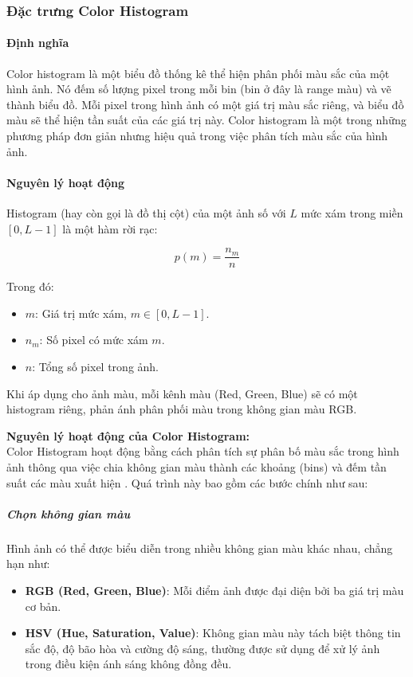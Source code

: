 \documentclass[a4paper,12pt]{article}
\begin{document}
\subsubsection{Đặc trưng Color Histogram}

\paragraph{Định nghĩa}
\hspace{5mm}Color histogram là một biểu đồ thống kê thể hiện phân phối màu sắc của một hình ảnh. Nó đếm số lượng pixel trong mỗi bin (bin ở đây là range màu) và vẽ thành biểu đồ. Mỗi pixel trong hình ảnh có một giá trị màu sắc riêng, và biểu đồ màu sẽ thể hiện tần suất của các giá trị này. Color histogram là một trong những phương pháp đơn giản nhưng hiệu quả trong việc phân tích màu sắc của hình ảnh.

\paragraph{Nguyên lý hoạt động}
\hspace{5mm}Histogram (hay còn gọi là đồ thị cột) của một ảnh số với \(L\) mức xám trong miền \([0, L-1]\) \cite{imageprocessing2019digital} là một hàm rời rạc:

\[
p(m) = \frac{n_m}{n}
\]

Trong đó:
\begin{itemize}
    \item \(m\): Giá trị mức xám, \(m \in [0, L-1]\).
    \item \(n_m\): Số pixel có mức xám \(m\).
    \item \(n\): Tổng số pixel trong ảnh.
\end{itemize}

Khi áp dụng cho ảnh màu, mỗi kênh màu (Red, Green, Blue) sẽ có một histogram riêng, phản ánh phân phối màu trong không gian màu RGB.

\vspace{0.5cm}
\noindent\textbf{Nguyên lý hoạt động của Color Histogram:} \\[0.15cm]
Color Histogram hoạt động bằng cách phân tích sự phân bố màu sắc trong hình ảnh thông qua việc chia không gian màu thành các khoảng (bins) và đếm tần suất các màu xuất hiện \cite{zilliz_color_histogram}. Quá trình này bao gồm các bước chính như sau:

\subparagraph{Chọn không gian màu}
\hspace{5mm}Hình ảnh có thể được biểu diễn trong nhiều không gian màu khác nhau, chẳng hạn như:
\begin{itemize}
    \item \textbf{RGB (Red, Green, Blue)}: Mỗi điểm ảnh được đại diện bởi ba giá trị màu cơ bản.
    \item \textbf{HSV (Hue, Saturation, Value)}: Không gian màu này tách biệt thông tin sắc độ, độ bão hòa và cường độ sáng, thường được sử dụng để xử lý ảnh trong điều kiện ánh sáng không đồng đều.
\end{itemize}
\end{document}
